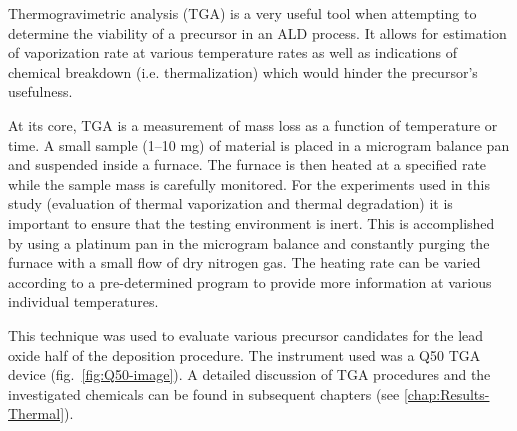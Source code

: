 Thermogravimetric analysis (TGA) is a very useful tool when attempting to determine the viability of a precursor in an ALD process. It allows for estimation of vaporization rate at various temperature rates as well as indications of chemical breakdown (i.e. thermalization) which would hinder the precursor's usefulness. 

At its core, TGA is a measurement of mass loss as a function of temperature or time. A small sample (1--10 mg) of material is placed in a microgram balance pan and suspended inside a furnace. The furnace is then heated at a specified rate while the sample mass is carefully monitored. For the experiments used in this study (evaluation of thermal vaporization and thermal degradation) it is important to ensure that the testing environment is inert. This is accomplished by using a platinum pan in the microgram balance and constantly purging the furnace with a small flow of dry nitrogen gas. The heating rate can be varied according to a pre-determined program to provide more information at various individual temperatures. 

This technique was used to evaluate various precursor candidates for the lead oxide half of the \PTO{} deposition procedure. The instrument used was a Q50 TGA device (fig.~\vref{fig:Q50-image}).  A detailed discussion of TGA procedures and the investigated chemicals can be found in subsequent chapters (see \vref{chap:Results-Thermal}). 

